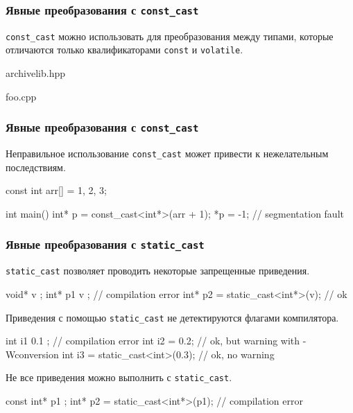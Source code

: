 \documentclass[compress, 8pt, aspectratio=169]{beamer}
\begin{document}
\begin{frame}[fragile]

    \frametitle{Явные преобразования с \texttt{const\_cast}}

    \hfill\break
    \verb|const_cast| можно использовать для преобразования между
    типами, которые отличаются только квалификаторами \verb|const| и \verb|volatile|.

        {archivelib.hpp}

        {foo.cpp}

\end{frame}

\begin{frame}[fragile]

    \frametitle{Явные преобразования с \texttt{const\_cast}}

    Неправильное использование \verb|const_cast| может привести к нежелательным
    последствиям.

    \begin{myinplacelisting}[minted language=cpp]
const int arr[] = {1, 2, 3};

int main() {
    int* p = const_cast<int*>(arr + 1);
    *p = -1; // segmentation fault
}
    \end{myinplacelisting}

\end{frame}

\begin{frame}[fragile]

    \frametitle{Явные преобразования с \texttt{static\_cast}}

    \verb|static_cast| позволяет проводить некоторые запрещенные приведения.

    \begin{myinplacelisting}[minted language=cpp]
void* v {};
int* p1 { v }; // compilation error
int* p2 = static_cast<int*>(v); // ok
    \end{myinplacelisting}

    Приведения с помощью \verb|static_cast| не детектируются флагами компилятора.

    \begin{myinplacelisting}[minted language=cpp]
int i1 { 0.1 }; // compilation error
int i2 = 0.2; // ok, but warning with -Wconversion
int i3 = static_cast<int>(0.3); // ok, no warning
    \end{myinplacelisting}

    Не все приведения можно выполнить с \verb|static_cast|.

    \begin{myinplacelisting}[minted language=cpp]
const int* p1 {};
int* p2 = static_cast<int*>(p1); // compilation error
    \end{myinplacelisting}

\end{frame}
\end{document}
